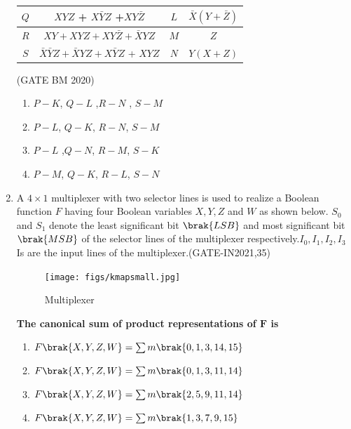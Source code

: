 \begin{enumerate}
\begin{table}[ht]
\begin{tabular}{|c|c|c|c|}
	\hline 

	$Q$ & $XYZ$ + $X\bar{Y}Z$ +$XY\bar{Z}$ & $L$ & $\bar{X}(Y+\bar{Z})$ \\

	\hline 

	$R$ & $XY + XYZ +XY\bar{Z} + \bar{X}YZ$ & $M$ & $Z$ \\

	\hline

	$S$ & $\bar{X}\bar{Y}Z + \bar{X}YZ + X\bar{Y}Z$ + $XYZ$ & $N$ & $Y(X+Z)$ \\

	\hline 
\end{tabular}
		
	\end{table}
		\hfill(GATE BM 2020)
	\begin{enumerate}[label=(\Alph*)]
			\item $P-K$, $Q-L$ ,$R-N$ , $S-M$ \\
			\item $P-L$, $Q-K$, $R-N$, $S-M$ \\
			\item $P-L$ ,$Q-N$, $R-M$, $S-K$ \\
			\item $P-M$, $Q-K$, $R-L$, $S-N$ \\
	\end{enumerate}

\item A $ 4\times1$ multiplexer with two selector lines is used to realize a Boolean function $F$ having four Boolean variables $X, Y, Z$ and $W$ as shown below. $S_0$ and $S_1$ denote the least significant bit $\brak{LSB}$ and most significant bit $\brak{MSB}$ of the selector lines of the multiplexer respectively.$I_0, I_1, I_2,I_3$ Is are the input lines of the multiplexer.\hfill(GATE-IN2021,35)
  \begin{figure}[H]
  \centering
  \texttt{[image: figs/kmapsmall.jpg]}
  \caption{Multiplexer}
  \label{fig:multiplexerwithtwoselectionliness}
\end{figure}
\textbf{The canonical sum of product representations of $\textbf{F}$ is} 
 \begin{enumerate}
        \item  $F\brak{X,Y,Z,W} = \sum m \brak{0,1,3,14,15}$
        \item  $F\brak{X,Y,Z,W} = \sum m \brak{0,1,3,11,14}$
        \item  $F\brak{X,Y,Z,W} = \sum m \brak{2,5,9,11,14}$
        \item  $F\brak{X,Y,Z,W} = \sum m \brak{1,3,7,9,15}$
    \end{enumerate}


\end{enumerate}
